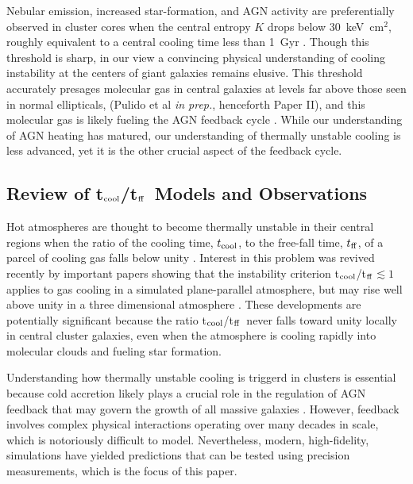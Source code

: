 \documentclass[twocolumn]{aastex6}
\newcommand{\tctff}{{t$_{\rm cool}$/t$_{\rm ff}$}}
\newcommand{\tc}{$t_{\rm cool}$}
\newcommand{\tff}{$t_{\rm ff}$}
\begin{document}
Nebular emission, increased star-formation, and AGN activity are preferentially observed in cluster cores when the central entropy $K$ drops below 30~keV~cm$^{2}$, roughly equivalent to a central cooling time less than 1~Gyr \cite[][]{Cavagnolo08,Rafferty08,Sanderson09a,Main17}.  Though this threshold is sharp, in our view a convincing physical understanding of cooling instability at the centers of giant galaxies remains elusive.  This threshold accurately presages molecular gas in central galaxies at levels far above those seen in normal ellipticals, (Pulido et al {\em in prep.}, henceforth Paper II), and this molecular gas is likely fueling the AGN feedback cycle \cite[][]{Tremblay16}.  While our understanding of AGN heating has matured, our understanding of thermally unstable cooling is less advanced, yet it is the other crucial aspect of the feedback cycle. 

\subsection{Review of \tctff\ Models and Observations}

Hot atmospheres are thought to become thermally unstable in their central regions when the ratio of the cooling time, \tc, to the free-fall time, \tff, of a parcel of cooling gas falls below unity \cite[][]{Cowie80,Nulsen86}.  Interest in this problem was revived recently by important papers showing that the instability criterion \tctff$\lesssim 1$ applies to gas cooling in a simulated plane-parallel atmosphere, but may rise well above unity in a three dimensional atmosphere \cite[][]{McCourt12,Sharma12b}.  These developments are potentially significant because the ratio \tctff\ never falls toward unity locally in central cluster galaxies, even when the atmosphere is cooling rapidly into molecular clouds and fueling star formation.  

Understanding how thermally unstable cooling is triggerd in clusters is essential because cold accretion likely plays a crucial role in the regulation of AGN feedback that may govern the growth of all massive galaxies \cite[][]{Gaspari12,Gaspari13,Li14b,Li15,Voit15a,Voit15b}.  However,  feedback involves complex physical interactions operating over many decades in scale, which is notoriously difficult to model.  Nevertheless, modern, high-fidelity, simulations have yielded predictions that can be tested using precision measurements, which is the focus of this paper. 
\end{document}
